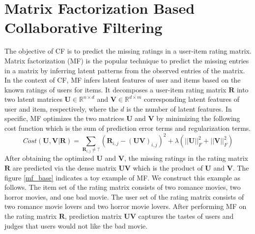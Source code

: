\documentclass[master,english,final]{kaist-ucs}
\begin{document}
\section{Matrix Factorization Based Collaborative Filtering}
The objective of CF is to predict the missing ratings in a user-item rating matrix.
Matrix factorization (MF) is the popular technique to predict the missing entries in a matrix by inferring latent patterns from the observed entries of the matrix.
In the context of CF, MF infers latent features of user and items based on the known ratings of users for items.
It decomposes a user-item rating matrix $\bm{R}$ into two latent matrices $\bm{U} \in \mathbb{R}^{n \times d}$ and $\bm{V} \in \mathbb{R}^{d \times m}$ corresponding latent features of user and item, respectively, where the $d$ is the number of latent features.
In specific, MF optimizes the two matrices $\bm{U}$ and $\bm{V}$ by minimizing the following cost function which is the sum of prediction error terms and regularization terms.
\begin{equation}
Cost(\bm{U},\bm{V} | \bm{R})=\sum_{\bm{R}_{i,j} \neq ?} (  \bm{R}_{i,j} - (\bm{UV})_{i,j} )^2 + \lambda(||\bm{U}||_F^2+||\bm{V}||_F^2)
\end{equation}
After obtaining the optimized $\bm{U}$ and $\bm{V}$, the missing ratings in the rating matrix $\bm{R}$ are predicted via the dense matrix $\bm{UV}$ which is the product of $\bm{U}$ and $\bm{V}$.
The figure \ref{mf_base} indicates a toy example of MF.
We construct this example as follows.
The item set of the rating matrix consists of two romance movies, two horror movies, and one bad movie.
The user set of the rating matrix consists of two romance movie lovers and two horror movie lovers.
After performing MF on the rating matrix $\bm{R}$, prediction matrix $\bm{UV}$ captures the tastes of users and judges that users would not like the bad movie.
\end{document}
